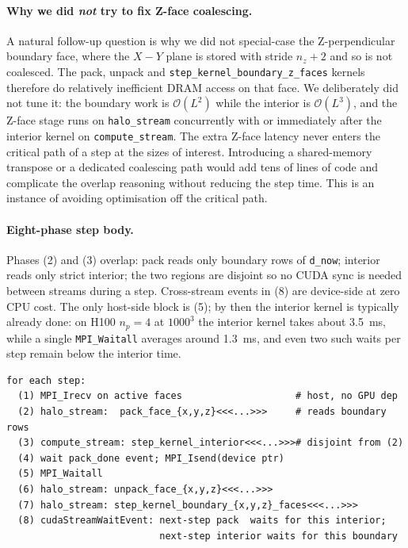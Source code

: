 \documentclass[10pt,a4paper]{article}
\begin{document}
\paragraph{Why we did \emph{not} try to fix Z-face coalescing.}
A natural follow-up question is why we did not special-case the Z-perpendicular boundary face, where the $X\!-\!Y$ plane is stored with stride $n_z{+}2$ and so is not coalesced. The pack, unpack and \texttt{step\_kernel\_boundary\_z\_faces} kernels therefore do relatively inefficient DRAM access on that face. We deliberately did not tune it: the boundary work is $\mathcal{O}(L^2)$ while the interior is $\mathcal{O}(L^3)$, and the Z-face stage runs on \texttt{halo\_stream} concurrently with or immediately after the interior kernel on \texttt{compute\_stream}. The extra Z-face latency never enters the critical path of a step at the sizes of interest. Introducing a shared-memory transpose or a dedicated coalescing path would add tens of lines of code and complicate the overlap reasoning without reducing the step time. This is an instance of avoiding optimisation off the critical path.




\paragraph{Eight-phase step body.}
Phases (2) and (3) overlap: pack reads only boundary rows of \texttt{d\_now}; interior reads only strict interior; the two regions are disjoint so no CUDA sync is needed between streams during a step. Cross-stream events in (8) are device-side at zero CPU cost. The only host-side block is (5); by then the interior kernel is typically already done: on H100 $n_p{=}4$ at $1000^3$ the interior kernel takes about 3.5~ms, while a single \texttt{MPI\_Waitall} averages around 1.3~ms, and even two such waits per step remain below the interior time.
\begin{lstlisting}
for each step:
  (1) MPI_Irecv on active faces                    # host, no GPU dep
  (2) halo_stream:  pack_face_{x,y,z}<<<...>>>     # reads boundary rows
  (3) compute_stream: step_kernel_interior<<<...>>># disjoint from (2)
  (4) wait pack_done event; MPI_Isend(device ptr)
  (5) MPI_Waitall
  (6) halo_stream: unpack_face_{x,y,z}<<<...>>>
  (7) halo_stream: step_kernel_boundary_{x,y,z}_faces<<<...>>>
  (8) cudaStreamWaitEvent: next-step pack  waits for this interior;
                           next-step interior waits for this boundary
\end{lstlisting}
\end{document}
